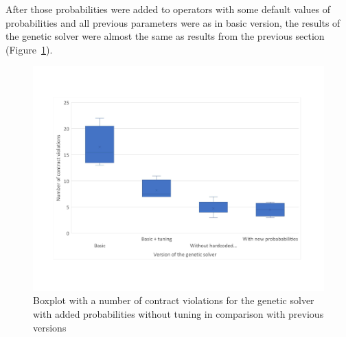 After those probabilities were added to operators with some default values of probabilities and all previous parameters were as in basic version, the results of the genetic solver were almost the same as results from the previous section (Figure~\ref{fig:boxplotsolverNewParameters}).
\begin{figure}
	\centering
	\includegraphics[width=\textwidth]{images/BoxPlotSolverNewParameters.pdf}
	\caption[Boxplot with a number of contract violations for the genetic solver with added probabilities without tuning in comparison with previous versions]{Boxplot with a number of contract violations for the genetic solver with added probabilities without tuning in comparison with previous versions}
	\label{fig:boxplotsolverNewParameters}
\end{figure}

